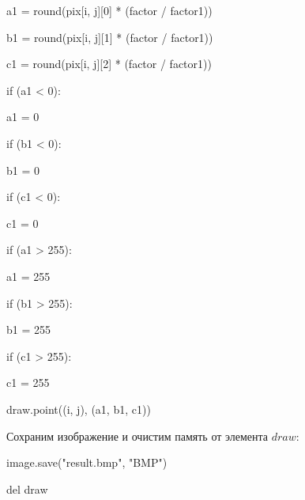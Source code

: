 \documentclass{article}
\newcommand\tab[1][1cm]{\hspace*{#1}}
\begin{document}
{

a1 = round(pix[i, j][0] * (factor / factor1))

b1 = round(pix[i, j][1] * (factor / factor1))

c1 = round(pix[i, j][2] * (factor / factor1))

if (a1 < 0):

\tab[1cm]		a1 = 0

if (b1 < 0):

\tab[1cm]		b1 = 0

if (c1 < 0):

\tab[1cm]		c1 = 0

if (a1 > 255):

\tab[1cm]		a1 = 255

if (b1 > 255):

\tab[1cm]		b1 = 255

if (c1 > 255):

\tab[1cm]		c1 = 255

draw.point((i, j), (a1, b1, c1))}
\vspace{1em}


Сохраним изображение и очистим память от элемента $draw$:
\vspace{1em}
	
{

image.save("result.bmp", "BMP")

del draw
 }
  
\end{document}
